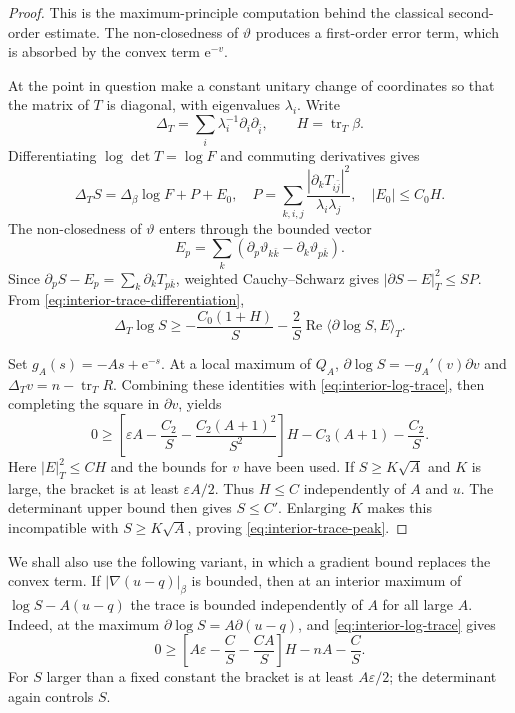 \begin{proof}
This is the maximum-principle computation behind the classical second-order estimate. The non-closedness of $\vartheta$ produces a first-order error term, which is absorbed by the convex term $\mathrm{e}^{-v}$.

At the point in question make a constant unitary change of coordinates so that the matrix of $T$ is diagonal, with eigenvalues $\lambda_i$. Write
\[
  \Delta_T=\sum_i\lambda_i^{-1}\partial_i\partial_{\bar i},
  \qquad H=\operatorname{tr}_T\beta.
\]
Differentiating $\log\det T=\log F$ and commuting derivatives gives
\begin{equation}\label{eq:interior-trace-differentiation}
  \Delta_TS=\Delta_\beta\log F+P+E_0,
  \quad
  P=\sum_{k,i,j}\frac{|\partial_kT_{i\bar j}|^2}{\lambda_i\lambda_j},
  \quad |E_0|\leq C_0H.
\end{equation}
The non-closedness of $\vartheta$ enters through the bounded vector
\[
  E_p=\sum_k(\partial_p\vartheta_{k\bar k}-\partial_k\vartheta_{p\bar k}).
\]
Since $\partial_pS-E_p=\sum_k\partial_kT_{p\bar k}$, weighted Cauchy--Schwarz gives $|\partial S-E|_T^2\leq SP$. From \eqref{eq:interior-trace-differentiation},
\begin{equation}\label{eq:interior-log-trace}
  \Delta_T\log S
  \geq-\frac{C_0(1+H)}S-
  \frac2S\operatorname{Re}\langle\partial\log S,E\rangle_T.
\end{equation}

Set $g_A(s)=-As+\mathrm{e}^{-s}$. At a local maximum of $Q_A$, $\partial\log S=-g_A'(v)\partial v$ and $\Delta_Tv=n-\operatorname{tr}_TR$. Combining these identities with \eqref{eq:interior-log-trace}, then completing the square in $\partial v$, yields
\begin{equation}\label{eq:interior-peak-inequality}
  0\geq
  \left[\varepsilon A-\frac{C_2}{S}-\frac{C_2(A+1)^2}{S^2}\right]H
  -C_3(A+1)-\frac{C_2}{S}.
\end{equation}
Here $|E|_T^2\leq CH$ and the bounds for $v$ have been used. If $S\geq K\sqrt A$ and $K$ is large, the bracket is at least $\varepsilon A/2$. Thus $H\leq C$ independently of $A$ and $u$. The determinant upper bound then gives $S\leq C'$. Enlarging $K$ makes this incompatible with $S\geq K\sqrt A$, proving \eqref{eq:interior-trace-peak}.
\end{proof}

We shall also use the following variant, in which a gradient bound replaces the convex term. If $|\nabla(u-q)|_\beta$ is bounded, then at an interior maximum of $\log S-A(u-q)$ the trace is bounded independently of $A$ for all large $A$. Indeed, at the maximum $\partial\log S=A\partial(u-q)$, and \eqref{eq:interior-log-trace} gives
\[
  0\geq\left[A\varepsilon-\frac CS-\frac{CA}{S}\right]H-nA-\frac CS.
\]
For $S$ larger than a fixed constant the bracket is at least $A\varepsilon/2$; the determinant again controls $S$.


